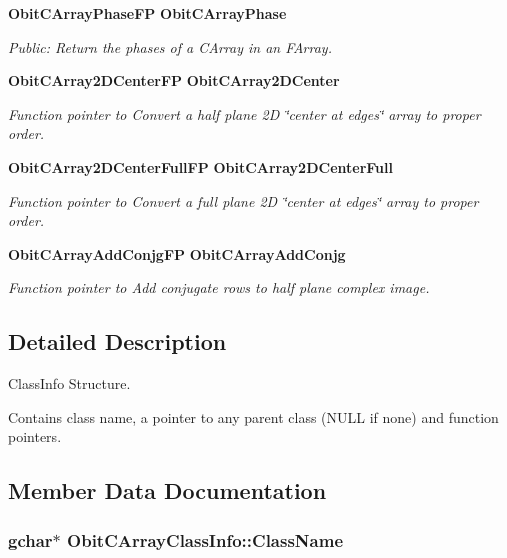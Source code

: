\begin{CompactItemize}
{\bf Obit\-CArray\-Phase\-FP} {\bf Obit\-CArray\-Phase}
\begin{CompactList}\small\item\em Public: Return the phases of a CArray in an FArray. \item\end{CompactList}\item 
{\bf Obit\-CArray2DCenter\-FP} {\bf Obit\-CArray2DCenter}
\begin{CompactList}\small\item\em Function pointer to Convert a half plane 2D \char`\"{}center at edges\char`\"{} array to proper order. \item\end{CompactList}\item 
{\bf Obit\-CArray2DCenter\-Full\-FP} {\bf Obit\-CArray2DCenter\-Full}
\begin{CompactList}\small\item\em Function pointer to Convert a full plane 2D \char`\"{}center at edges\char`\"{} array to proper order. \item\end{CompactList}\item 
{\bf Obit\-CArray\-Add\-Conjg\-FP} {\bf Obit\-CArray\-Add\-Conjg}
\begin{CompactList}\small\item\em Function pointer to Add conjugate rows to half plane complex image. \item\end{CompactList}\end{CompactItemize}


\subsection{Detailed Description}
Class\-Info Structure. 

Contains class name, a pointer to any parent class (NULL if none) and function pointers. 



\subsection{Member Data Documentation}
\subsubsection{\setlength{\rightskip}{0pt plus 5cm}gchar$\ast$ {\bf Obit\-CArray\-Class\-Info::Class\-Name}}\label{structObitCArrayClassInfo_o2}


